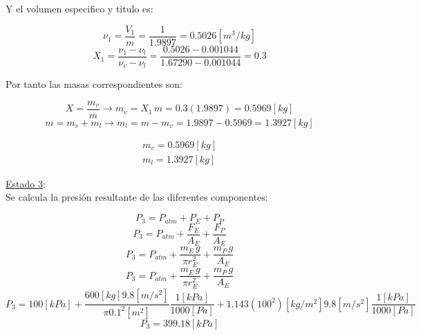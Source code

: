 \documentclass[letter,11pt]{article}
\begin{document}
\begin{enumerate}
Y el volumen especifico y titulo es:

\begin{equation*}
    \nu_1=\frac{V_1}{m}=\frac{1}{1.9897}=0.5026[m^3/kg]
\end{equation*}
\begin{equation*}
    X_1=\frac{\nu_1-\nu_l}{\nu_v-\nu_l}
    =\frac{0.5026-0.001044}{1.67290-0.001044}
    =0.3
\end{equation*}

Por tanto las masas correspondientes son:

\begin{equation*}
    X=\frac{m_v}{m}\rightarrow
    m_v=X_1\,m=0.3(1.9897)=0.5969[kg]
\end{equation*}
\begin{equation*}
    m=m_v+m_l\rightarrow
    m_l=m-m_v=1.9897-0.5969=1.3927[kg]
\end{equation*}

\begin{equation*}
\boxed{
    \begin{array}{l}
        m_v=0.5969[kg] \\
        m_l=1.3927[kg] 
    \end{array}
}
\end{equation*}

\underline{Estado 3}:\\
Se calcula la presión resultante de las diferentes componentes:

\begin{equation*}
    P_3=P_{atm}+P_E+P_P
\end{equation*}
\begin{equation*}
    P_3=P_{atm}+\frac{F_E}{A_E}+\frac{F_P}{A_E}
\end{equation*}
\begin{equation*}
    P_3=P_{atm}+\frac{m_E\,g}{\pi r^2_E}+\frac{m_P\,g}{A_E}
\end{equation*}
\begin{equation*}
    P_3=P_{atm}+\frac{m_E\,g}{\pi r^2_E}+\frac{m_P\,g}{A_E}
\end{equation*}
\begin{equation*}
    P_3=100[kPa]+\frac{600[kg]9.8[m/s^2]}{\pi0.1^2[m^2]}\frac{1[kPa]}{1000[Pa]}+
    1.143(100^2)[kg/m^2]9.8[m/s^2]\frac{1[kPa]}{1000[Pa]}
\end{equation*}
\begin{equation*}
    P_3=399.18[kPa]
\end{equation*}


\end{enumerate}
\end{document}
